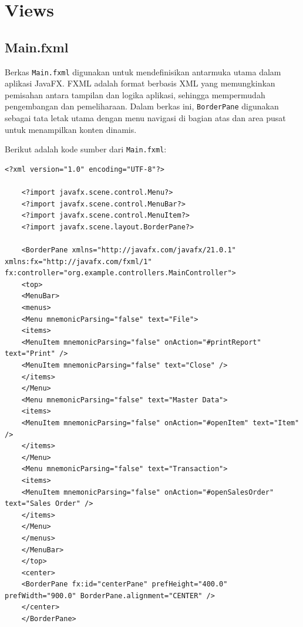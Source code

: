 \section{Views}

\subsection{Main.fxml}

Berkas \texttt{Main.fxml} digunakan untuk mendefinisikan antarmuka utama dalam aplikasi JavaFX. FXML adalah format berbasis XML yang memungkinkan pemisahan antara tampilan dan logika aplikasi, sehingga mempermudah pengembangan dan pemeliharaan. Dalam berkas ini, \texttt{BorderPane} digunakan sebagai tata letak utama dengan menu navigasi di bagian atas dan area pusat untuk menampilkan konten dinamis.

Berikut adalah kode sumber dari \texttt{Main.fxml}:

\begin{lstlisting}[style=XmlStyle]
<?xml version="1.0" encoding="UTF-8"?>
	
	<?import javafx.scene.control.Menu?>
	<?import javafx.scene.control.MenuBar?>
	<?import javafx.scene.control.MenuItem?>
	<?import javafx.scene.layout.BorderPane?>
	
	<BorderPane xmlns="http://javafx.com/javafx/21.0.1" xmlns:fx="http://javafx.com/fxml/1" fx:controller="org.example.controllers.MainController">
	<top>
	<MenuBar>
	<menus>
	<Menu mnemonicParsing="false" text="File">
	<items>
	<MenuItem mnemonicParsing="false" onAction="#printReport" text="Print" />
	<MenuItem mnemonicParsing="false" text="Close" />
	</items>
	</Menu>
	<Menu mnemonicParsing="false" text="Master Data">
	<items>
	<MenuItem mnemonicParsing="false" onAction="#openItem" text="Item" />
	</items>
	</Menu>
	<Menu mnemonicParsing="false" text="Transaction">
	<items>
	<MenuItem mnemonicParsing="false" onAction="#openSalesOrder" text="Sales Order" />
	</items>
	</Menu>
	</menus>
	</MenuBar>
	</top>
	<center>
	<BorderPane fx:id="centerPane" prefHeight="400.0" prefWidth="900.0" BorderPane.alignment="CENTER" />
	</center>
	</BorderPane>
\end{lstlisting}

